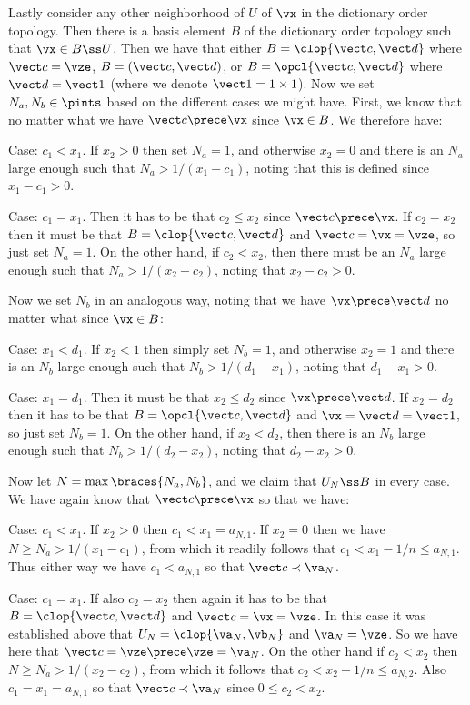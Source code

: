 {{    Lastly consider any other neighborhood of $U$ of $\vx$ in the dictionary order topology.
    Then there is a basis element $B$ of the dictionary order topology such that $\vx \in B \ss U$.
    Then we have that either $B = \clop{\vc, \vd}$ where $\vc = \vze$, $B = (\vc, \vd)$, or $B = \opcl{\vc, \vd}$ where $\vd = \vone$ (where we denote $\vone = 1 \times 1$).
    Now we set $N_a,N_b \in \pints$ based on the different cases we might have.
    First, we know that no matter what we have $\vc \prece \vx$ since $\vx\in B$.
    We therefore have:

    Case: $c_1 < x_1$.
    If $x_2 > 0$ then set $N_a = 1$, and otherwise $x_2 = 0$ and there is an $N_a$ large enough such that $N_a > 1/(x_1-c_1)$, noting that this is defined since $x_1-c_1>0$.

    Case: $c_1 = x_1$.
    Then it has to be that $c_2 \leq x_2$ since $\vc \prece \vx$.
    If $c_2 = x_2$ then it must be that $B = \clop{\vc, \vd}$ and $\vc = \vx = \vze$, so just set $N_a = 1$.
    On the other hand, if $c_2 < x_2$, then there must be an $N_a$ large enough such that $N_a > 1/(x_2-c_2)$, noting that $x_2 - c_2 > 0$.

    Now we set $N_b$ in an analogous way, noting that we have $\vx \prece \vd$ no matter what since $\vx \in B$:

    Case: $x_1 < d_1$.
    If $x_2 < 1$ then simply set $N_b = 1$, and otherwise $x_2 = 1$ and there is an $N_b$ large enough such that $N_b > 1/(d_1-x_1)$, noting that $d_1-x_1 > 0$.

    Case: $x_1 = d_1$.
    Then it must be that $x_2 \leq d_2$ since $\vx \prece \vd$.
    If $x_2 = d_2$ then it has to be that $B = \opcl{\vc, \vd}$ and $\vx = \vd = \vone$, so just set $N_b = 1$.
    On the other hand, if $x_2 < d_2$, then there is an $N_b$ large enough such that $N_b > 1/(d_2-x_2)$, noting that $d_2-x_2 > 0$.

    Now let $N = \max\braces{N_a, N_b}$, and we claim that $U_N \ss B$ in every case.
    We have again know that $\vc \prece \vx$ so that we have:

    Case: $c_1 < x_1$.
    If $x_2 > 0$ then $c_1 < x_1 = a_{N,1}$.
    If $x_2 = 0$ then we have $N \geq N_a > 1/(x_1-c_1)$, from which it readily follows that $c_1 < x_1 - 1/n \leq a_{N,1}$.
    Thus either way we have $c_1 < a_{N,1}$ so that $\vc \prec \va_N$.

    Case: $c_1 = x_1$.
    If also $c_2 = x_2$ then again it has to be that $B = \clop{\vc, \vd}$ and $\vc = \vx = \vze$.
    In this case it was established above that $U_N = \clop{\va_N, \vb_N}$ and $\va_N = \vze$.
    So we have here that $\vc = \vze \prece \vze = \va_N$.
    On the other hand if $c_2 < x_2$ then $N \geq N_a > 1/(x_2-c_2)$, from which it follows that $c_2 < x_2 - 1/n \leq a_{N,2}$.
    Also $c_1 = x_1 = a_{N,1}$ so that $\vc \prec \va_N$ since $0 \leq c_2 < x_2$.

}}
